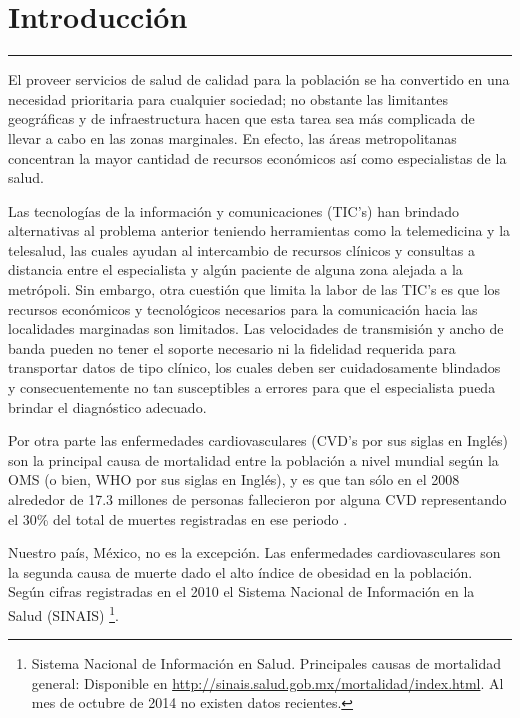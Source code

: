 \chapter{Introducción}\label{capit:cap1}
\vspace{-2.0325ex}%
\noindent
\rule{\textwidth}{0.5pt}
\vspace{-5.5ex}%
\newcommand{\pushline}{\Indp}

El proveer servicios de salud de calidad para la población se ha convertido en una necesidad prioritaria para cualquier sociedad; no obstante las limitantes geográficas y de infraestructura hacen que esta tarea sea más complicada de llevar a cabo en las zonas marginales. En efecto, las áreas metropolitanas concentran la mayor cantidad de recursos económicos así como especialistas de la salud.

Las tecnologías de la información y comunicaciones (TIC's) han brindado alternativas al problema anterior teniendo herramientas como la telemedicina y la telesalud, las cuales ayudan al intercambio de recursos clínicos y consultas a distancia entre el especialista y algún paciente de alguna zona alejada a la metrópoli. Sin embargo, otra cuestión que limita la labor de las TIC's es que los recursos económicos y tecnológicos necesarios para la comunicación hacia las localidades marginadas son limitados. Las velocidades de transmisión y ancho de banda pueden no tener el soporte necesario ni la fidelidad requerida para transportar datos de tipo clínico, los cuales deben ser cuidadosamente blindados y consecuentemente no tan susceptibles a errores para que el especialista pueda brindar el diagnóstico adecuado.

Por otra parte las enfermedades cardiovasculares (CVD's por sus siglas en Inglés) son la principal causa de mortalidad entre la población a nivel mundial según la OMS (o bien, WHO por sus siglas en Inglés), y es que tan sólo en el 2008 alrededor de 17.3 millones de personas fallecieron por alguna CVD representando el 30\% del total de muertes registradas en ese periodo \cite[]{Who2012}.

Nuestro país, México, no es la excepción. Las enfermedades cardiovasculares son la segunda causa de muerte dado el alto índice de obesidad en la población. Según cifras registradas en el 2010 el Sistema Nacional de Información en la Salud (SINAIS) \footnote{Sistema Nacional de Información en Salud. Principales causas de mortalidad general: Disponible en \url{http://sinais.salud.gob.mx/mortalidad/index.html}. Al mes de octubre de 2014 no existen datos recientes.}.

